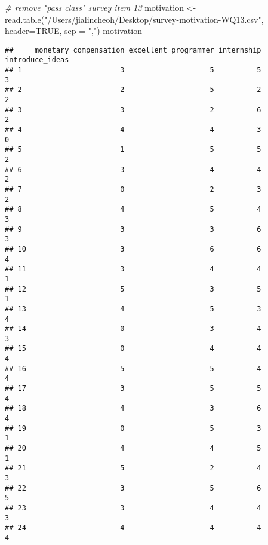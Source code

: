 \documentclass[
]{article}
\newenvironment{Shaded}{\begin{snugshade}}{\end{snugshade}}
\newcommand{\AttributeTok}[1]{\textcolor[rgb]{0.77,0.63,0.00}{#1}}
\newcommand{\CommentTok}[1]{\textcolor[rgb]{0.56,0.35,0.01}{\textit{#1}}}
\newcommand{\ConstantTok}[1]{\textcolor[rgb]{0.00,0.00,0.00}{#1}}
\newcommand{\FunctionTok}[1]{\textcolor[rgb]{0.00,0.00,0.00}{#1}}
\newcommand{\NormalTok}[1]{#1}
\newcommand{\OtherTok}[1]{\textcolor[rgb]{0.56,0.35,0.01}{#1}}
\newcommand{\StringTok}[1]{\textcolor[rgb]{0.31,0.60,0.02}{#1}}
\begin{document}
\begin{Shaded}
\begin{Highlighting}[]
\CommentTok{\# remove "pass class" survey item 13}
\NormalTok{motivation }\OtherTok{\textless{}{-}} \FunctionTok{read.table}\NormalTok{(}\StringTok{"/Users/jialincheoh/Desktop/survey{-}motivation{-}WQ13.csv"}\NormalTok{, }\AttributeTok{header=}\ConstantTok{TRUE}\NormalTok{, }\AttributeTok{sep =} \StringTok{","}\NormalTok{)}
\NormalTok{motivation}
\end{Highlighting}
\end{Shaded}

\begin{verbatim}
##     monetary_compensation excellent_programmer internship introduce_ideas
## 1                       3                    5          5               3
## 2                       2                    5          2               2
## 3                       3                    2          6               2
## 4                       4                    4          3               0
## 5                       1                    5          5               2
## 6                       3                    4          4               2
## 7                       0                    2          3               2
## 8                       4                    5          4               3
## 9                       3                    3          6               3
## 10                      3                    6          6               4
## 11                      3                    4          4               1
## 12                      5                    3          5               1
## 13                      4                    5          3               4
## 14                      0                    3          4               3
## 15                      0                    4          4               4
## 16                      5                    5          4               4
## 17                      3                    5          5               4
## 18                      4                    3          6               4
## 19                      0                    5          3               1
## 20                      4                    4          5               1
## 21                      5                    2          4               3
## 22                      3                    5          6               5
## 23                      3                    4          4               3
## 24                      4                    4          4               4

\end{verbatim}
\end{document}
